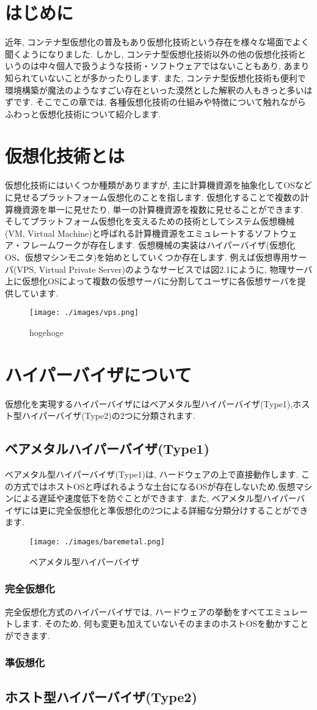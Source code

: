\section{はじめに}
近年, コンテナ型仮想化の普及もあり仮想化技術という存在を様々な場面でよく聞くようになりました. しかし, コンテナ型仮想化技術以外の他の仮想化技術というのは中々個人で扱うような技術・ソフトウェアではないこともあり, あまり知られていないことが多かったりします. また, コンテナ型仮想化技術も便利で環境構築が魔法のようなすごい存在といった漠然とした解釈の人もきっと多いはずです. そこでこの章では, 各種仮想化技術の仕組みや特徴について触れながらふわっと仮想化技術について紹介します.

\section{仮想化技術とは}
仮想化技術にはいくつか種類がありますが, 主に計算機資源を抽象化してOSなどに見せるプラットフォーム仮想化のことを指します. 仮想化することで複数の計算機資源を単一に見せたり, 単一の計算機資源を複数に見せることができます. そしてプラットフォーム仮想化を支えるための技術としてシステム仮想機械(VM, Virtual Machine)と呼ばれる計算機資源をエミュレートするソフトウェア・フレームワークが存在します. 仮想機械の実装はハイパーバイザ(仮想化OS、仮想マシンモニタ)を始めとしていくつか存在します. 例えば仮想専用サーバ(VPS, Virtual Private Server)のようなサービスでは図2.1にように, 物理サーバ上に仮想化OSによって複数の仮想サーバに分割してユーザに各仮想サーバを提供しています.
\begin{figure}[htbp]
    \centering
    \texttt{[image: ./images/vps.png]}
    \caption{hogehoge}
    \label{fig:one}
\end{figure}

\section{ハイパーバイザについて}
仮想化を実現するハイパーバイザにはベアメタル型ハイパーバイザ(Type1),ホスト型ハイパーバイザ(Type2)の2つに分類されます.

\subsection{ベアメタルハイパーバイザ(Type1)}
ベアメタル型ハイパーバイザ(Type1)は, ハードウェアの上で直接動作します. この方式ではホストOSと呼ばれるような土台になるOSが存在しないため,仮想マシンによる遅延や速度低下を防ぐことができます. また, ベアメタル型ハイパーバイザには更に完全仮想化と準仮想化の2つによる詳細な分類分けすることができます.
\begin{figure}[htbp]
    \centering
    \texttt{[image: ./images/baremetal.png]}
    \caption{ベアメタル型ハイパーバイザ}
    \label{fig:one}
\end{figure}

\subsubsection{完全仮想化}
完全仮想化方式のハイパーバイザでは, ハードウェアの挙動をすべてエミュレートします. そのため, 何も変更も加えていないそのままのホストOSを動かすことができます.
\subsubsection{準仮想化}
\subsection{ホスト型ハイパーバイザ(Type2)}
